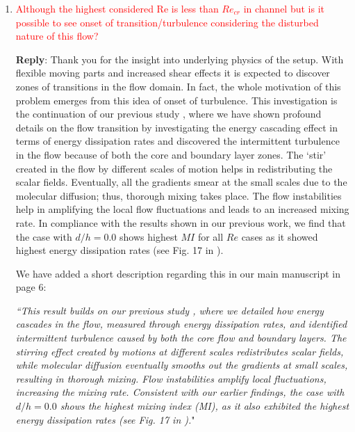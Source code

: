 \documentclass[onecolumn,a4paper,amsmath,amssym,pre]{revtex4}
\begin{document}
{\begin{enumerate}
We need to clarify that the outlet condition is assumed as zero gradient velocity and ambient pressure. The parabolic profiled fully developed velocity condition is given at the bifurcated inlets (left) for each dye. There is no fully developed condition at the channel outlet. Apologies for the ambiguous writing.
We have rephrased the sentence in the revised manuscript for better clarity as: 

``\textit{At the channel outlet, we have assumed zero velocity gradient boundary condition. A parabolic profiled inlet from left is supplied for both the top and bottom half to mimic fully developed flow for the two different concentration fields, as previously described.}"

\item \textcolor{red}{Although the highest considered Re is less than $Re_{cr}$ in channel but is it possible to see onset of transition/turbulence considering the disturbed nature of this flow?}

\textbf{Reply}: Thank you for the insight into underlying physics of the setup. With flexible moving parts and increased shear effects it is expected to discover zones of transitions in the flow domain. In fact, the whole motivation of this problem emerges from this idea of onset of turbulence. This investigation is the continuation of our previous study \cite{Self2019}, where we have shown profound details on the flow transition by investigating the energy cascading effect in terms of energy dissipation rates and discovered the intermittent turbulence in the flow because of both the core and boundary layer zones. The ‘stir’ created in the flow by different scales of
motion helps in redistributing the scalar fields. Eventually,
all the gradients smear at the small scales due to the molecular diffusion; thus, thorough mixing takes place. The flow instabilities help in amplifying the local flow fluctuations and
leads to an increased mixing rate. 
In compliance with the results shown in our previous work, we find that the case with $d/h=0.0$ shows highest $MI$ for all $Re$ cases as it showed highest energy dissipation rates (see Fig. 17 in \cite{Self2019}).


We have added a short description regarding this in our main manuscript in page 6:

 \textit{``This result builds on our previous study \cite{Self2019}, where we detailed how energy cascades in the flow, measured through energy dissipation rates, and identified intermittent turbulence caused by both the core flow and boundary layers. The stirring effect created by motions at different scales redistributes scalar fields, while molecular diffusion eventually smooths out the gradients at small scales, resulting in thorough mixing. Flow instabilities amplify local fluctuations, increasing the mixing rate. Consistent with our earlier findings, the case with $d/h=0.0$ shows the highest mixing index (MI), as it also exhibited the highest energy dissipation rates (see Fig. 17 in \cite{Self2019}).}"



\end{enumerate}}
\end{document}
